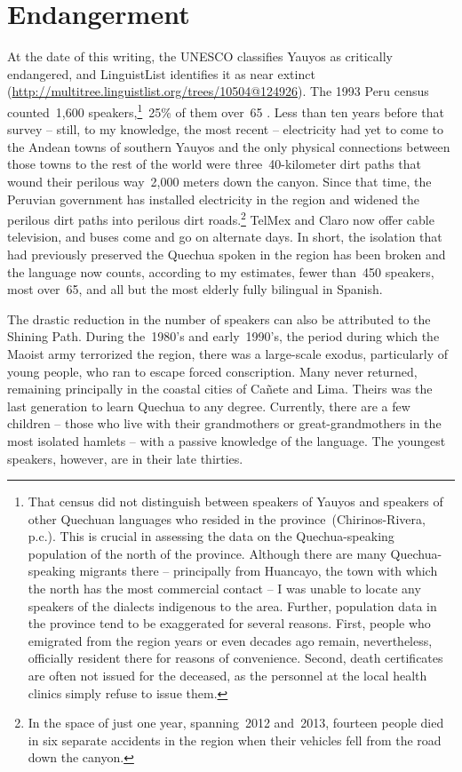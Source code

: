 \section{Endangerment}\label{sec:endangerment}
At the date of this writing, the UNESCO classifies Yauyos as critically endangered, and LinguistList identifies it as near extinct (\url{http://multitree.linguistlist.org/trees/10504@124926}). The 1993 Peru census counted~1,600 speakers,\footnote{That census did not distinguish between speakers of Yauyos and speakers of other Quechuan languages who resided in the province~(Chirinos-Rivera, p.c.). This is crucial in assessing the data on the Quechua-speaking population of the north of the province. Although there are many Quechua-speaking migrants there -- principally from Huancayo, the town with which the north has the most commercial contact -- I was unable to locate any speakers of the dialects indigenous to the area. Further, population data in the province tend to be exaggerated for several reasons. First, people who emigrated from the region years or even decades ago remain, nevertheless, officially resident there for reasons of convenience. Second, death certificates are often not issued for the deceased, as the personnel at the local health clinics simply refuse to issue them.}~25\%{} of them over~65 \citep[121]{Chirinos01}. Less than ten years before that survey -- still, to my knowledge, the most recent -- electricity had yet to come to the Andean towns of southern Yauyos and the only physical connections between those towns to the rest of the world were three~40-kilometer dirt paths that wound their perilous way~2,000 meters down the canyon. Since that time, the Peruvian government has installed electricity in the region and widened the perilous dirt paths into perilous dirt roads.\footnote{In the space of just one year, spanning~2012 and~2013, fourteen people died in six separate accidents in the region when their vehicles fell from the road down the canyon.} TelMex and Claro now offer cable television, and buses come and go on alternate days. In short, the isolation that had previously preserved the Quechua spoken in the region has been broken and the language now counts, according to my estimates, fewer than~450 speakers, most over~65, and all but the most elderly fully bilingual in Spanish. 

The drastic reduction in the number of speakers can also be attributed to the Shining Path. During the~1980's and early~1990's, the period during which the Maoist army terrorized the region, there was a large-scale exodus, particularly of young people, who ran to escape forced conscription. Many never returned, remaining principally in the coastal cities of Ca\~nete and Lima. Theirs was the last generation to learn Quechua to any degree. Currently, there are a few children -- those who live with their grandmothers or great-grandmothers in the most isolated hamlets -- with a passive knowledge of the language. The youngest speakers, however, are in their late thirties.

